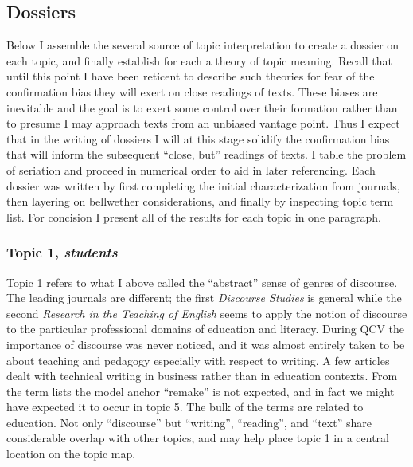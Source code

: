 \documentclass[]{book}
\theoremstyle{definition}
\theoremstyle{definition}
\theoremstyle{definition}
\theoremstyle{remark}
\begin{document}
\hypertarget{dossiers}{%
\subsection{Dossiers}\label{dossiers}}

Below I assemble the several source of topic interpretation to create a
dossier on each topic, and finally establish for each a theory of topic
meaning. Recall that until this point I have been reticent to describe
such theories for fear of the confirmation bias they will exert on close
readings of texts. These biases are inevitable and the goal is to exert
some control over their formation rather than to presume I may approach
texts from an unbiased vantage point. Thus I expect that in the writing
of dossiers I will at this stage solidify the confirmation bias that
will inform the subsequent ``close, but'' readings of texts. I table the
problem of seriation and proceed in numerical order to aid in later
referencing. Each dossier was written by first completing the initial
characterization from journals, then layering on bellwether
considerations, and finally by inspecting topic term list. For concision
I present all of the results for each topic in one paragraph.

\hypertarget{topic-1-students}{%
\subsubsection{\texorpdfstring{Topic 1,
\emph{students}}{Topic 1, students}}\label{topic-1-students}}

Topic 1 refers to what I above called the ``abstract'' sense of genres
of discourse. The leading journals are different; the first
\emph{Discourse Studies} is general while the second \emph{Research in
the Teaching of English} seems to apply the notion of discourse to the
particular professional domains of education and literacy. During QCV
the importance of discourse was never noticed, and it was almost
entirely taken to be about teaching and pedagogy especially with respect
to writing. A few articles dealt with technical writing in business
rather than in education contexts. From the term lists the model anchor
``remake'' is not expected, and in fact we might have expected it to
occur in topic 5. The bulk of the terms are related to education. Not
only ``discourse'' but ``writing'', ``reading'', and ``text'' share
considerable overlap with other topics, and may help place topic 1 in a
central location on the topic map.
\end{document}
